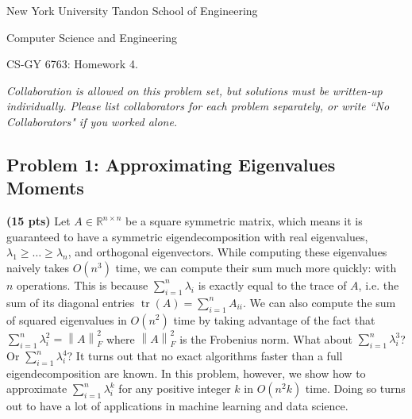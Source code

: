 \documentclass[10pt]{article}
\newcommand{\R}{\mathbb{R}}
\DeclareMathOperator{\tr}{tr}
\newcommand{\norm}[1]{\left\lVert #1\right\rVert}
\begin{document}
	
\begin{center}
	\normalsize
	New York University Tandon School of Engineering
	
	Computer Science and Engineering
	\medskip
	
	\large
	CS-GY 6763: Homework 4.
	
	\medskip
	
	\normalsize 
	\noindent \emph{Collaboration is allowed on this problem set, but solutions must be written-up individually. Please list collaborators for each problem separately, or write ``No Collaborators" if you worked alone.}
	\medskip
\end{center}

\subsection{Problem 1: Approximating Eigenvalues Moments}
\textbf{(15 pts)} Let $A \in \R^{n\times n}$ be a square symmetric matrix, which means it is guaranteed to have a symmetric eigendecomposition with real eigenvalues, $\lambda_1 \ge \ldots \ge \lambda_n$, and orthogonal eigenvectors. While computing these eigenvalues naively takes $O(n^3)$ time, we can compute their sum much more quickly: with $n$ operations. This is because $\sum_{i=1}^n \lambda_i$ is exactly equal to the trace of $A$, i.e. the sum of its diagonal entries $\tr(A) = \sum_{i=1}^n A_{ii}$. We can also compute the sum of squared eigenvalues in $O(n^2)$ time by taking advantage of the fact that $\sum_{i=1}^n \lambda_i^2 = \norm{A}_F^2$ where $\norm{A}_F^2$ is the Frobenius norm. What about $\sum_{i=1}^n \lambda_i^3$? Or $\sum_{i=1}^n \lambda_i^4$? It turns out that no exact algorithms faster than a full eigendecomposition are known. In this problem, however, we show how to approximate $\sum_{i=1}^n \lambda_i^k$ for any positive integer $k$ in $O(n^2 k)$ time. Doing so turns out to have a lot of applications in machine learning and data science.
\end{document}
